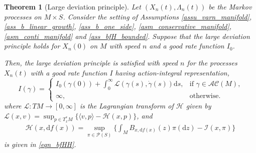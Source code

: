 \documentclass[a4paper]{article}
\numberwithin{equation}{section}
\newtheorem{theorem}{Theorem}[section]
\theoremstyle{definition}
\begin{document}
\begin{theorem}[Large deviation principle]\label{thm_LDPmanifold} 
Let $(X_n(t),\Lambda_n(t))$ be the Markov processes on $M\times S$. Consider the setting of Assumptions \ref{assu_varn_manifold}, \ref{ass_b_linear_growth}, \ref{ass_b_one_side}, \ref{asm_conservative_manifold}, \ref{asm_conti_manifold} and \ref{ass_bfH_bounded}.
	Suppose that 
	the large deviation principle holds for $X_n(0)$ on $M$ with speed $n$ and a good rate function $I_0$.
\par
Then, the large
deviation principle is satisfied with speed $n$ for the processes $X_n(t)$ with a good rate function $I$ having action-integral representation,
\begin{equation*}
	I(\gamma)=
	\begin{cases}
		I_0(\gamma(0))+\int^\infty_0\mathcal{L}\left(\gamma(s),\dot{\gamma}(s)\right)\mathrm{d}s,&\mbox{if~$\gamma\in\mathcal{AC}(M)$,}\\
		\infty,&\mbox{otherwise.}
	\end{cases}
\end{equation*}
where $\mathcal{L}: TM \to  [0, \infty]$ is the Lagrangian transform of $\mathcal{H}$ given by $\mathcal{L}(x, v) = \sup_{p\in T^*_xM} \{\langle v, p\rangle - \mathcal{H}(x, p)\} $,
and \begin{equation*}
\begin{split}
\mathcal{H}(x,\mathrm{d}f(x))=\sup_{\pi\in\mathcal{P}(S)}\big\{\int_M B_{x,\mathrm{d}f(x)}(z)\pi(\text{d}z)-\mathcal{I}(x,\pi)\big\}
\end{split}
\end{equation*}
is given in \eqref{eqn_bfHH}.
\end{theorem}
\end{document}

